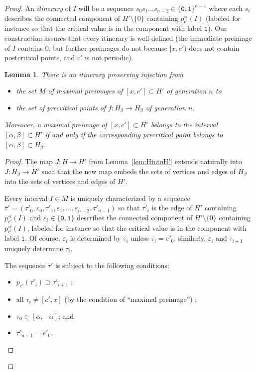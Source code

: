 \documentclass[12pt]{amsart}
\newcommand{\sm}{\setminus}
\newcommand{\0}{\texttt{0}}
\newcommand{\1}{\texttt{1}}
\newcommand\eps{\varepsilon}
\newtheorem{lemma}[theorem]{Lemma}
\theoremstyle{definition}
\numberwithin{equation}{section}
\newcommand{\ovl}[1]{\overline{#1}}
\newcounter{reminder}[section]
\newcounter{treminder}
\newcommand{\reminder}[1]{\stepcounter{reminder}\stepcounter{treminder}$\rhd$\textsl{#1}$\lhd$\marginpar{\thesection.\arabic{reminder}$\lhd\rhd\lhd\rhd\lhd\rhd$}}
\renewcommand{\reminder}[1]{}
\begin{document}
\begin{proof}
An \emph{itinerary} of $I$ will be a sequence $s_{0}s_1\dots s_{n-2}\in\{\0,\1\}^{n-1}$ where each $s_{i}$ describes the connected component of $H'\setminus \{0\}$ containing $p_{c'}^{\circ i}(I)$ (labeled for instance so that the critical value is in the component with label $\1$). {Our construction assures that every itinerary is well-defined (the immediate preimage of $I$ contains $0$, but further preimages do not because $[x,c')$ does not contain postcritical points, and $c'$ is not periodic). }




\pagebreak%

\begin{lemma}
\label{lem:PreCritInterv}
There is an itinerary preserving injection from\nopagebreak
\begin{itemize}\nopagebreak
\item the set $M$ of maximal preimages of $[x,c'] \subset H'$ of generation $n$ to
\item the set of precritical points of $f:H_\beta\to H_\beta$ of generation $n$.
\end{itemize}
Moreover, a maximal preimage of $[x,c'] \subset H'$ belongs to the interval $[\alpha,\beta]\subset H'$ if and only if the corresponding precritical point belongs to $[\alpha,\beta]\subset H_\beta$.
\end{lemma}

\begin{proof}
The map $J:H\to H'$ from Lemma~\ref{lem:HintoH'} extends naturally into $J:H_\beta \to H'$ such that the new map
embeds the sets of vertices and edges of $H_\beta$ into the sets of vertices and edges of $H'$.

Every interval $I\in M$ is uniquely characterized by a sequence $\ovl \tau'=(\tau'_0,\eps_{0},\tau'_1,\eps_{1},\dots, \eps_{n-2},\tau'_{n-1})$ so that $\tau'_i$ is the edge of $H'$ containing $p_{c'}^{\circ i}(I)$ and $\eps_i\in \{\0,\1\}$ describes the connected component of $H'\sm \{0\}$ containing $p_{c'}^{\circ i}(I)$, labeled for instance so that the critical value is in the component with label $\1$. Of course, $\eps_i$ is determined by $\tau_i$ unless  $\tau_i=e'_0$; similarly, $\eps_i$ and $\tau_{i+1}$ uniquely determine $\tau_i$. 

The sequence $\ovl \tau'$ is subject to the following conditions:
\begin{itemize}
\item
$p_{c'}(\tau'_i)\supset \tau'_{i+1}$ \;;
\item
all $\tau_i\neq [c',x]$ (by the condition of ``maximal preimage'') \;;
\item
$\tau_0\subset [\alpha,-\alpha]$\;; and \item $\tau'_{n-1}=e'_0$.
\end{itemize}
 

\end{proof}
\end{proof}
\end{document}
